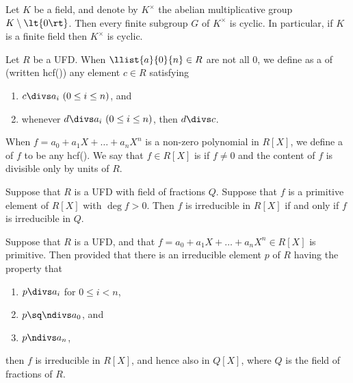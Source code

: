 \documentclass{article}
\begin{document}
  \begin{ttheorem}
    Let \( K \) be a field, and denote by \( K^\times \) the abelian multiplicative group \( K\setminus \lt\{ 0 \rt\} \).
    Then every finite subgroup \( G \) of \( K^\times \) is cyclic.
    In particular, if \( K \) is a finite field then \( K^\times \) is cyclic.
  \end{ttheorem}

  \begin{tdefinition}
    Let \( R \) be a UFD.
    When \( \llist{a}{0}{n}\in R \) are not all 0, we define as a  of  (written hcf()) any element \( c\in R \) satisfying \begin{enumerate}[label=(\roman*)]
      \item \( c\divs a_i\ (0\leq i\leq n) \), and
      \item whenever \( d\divs a_i\ (0\leq i\leq n) \), then \( d\divs c \).
    \end{enumerate}
    When \( f=a_0+a_1X+\ldots +a_nX^n \) is a non-zero polynomial in \( R[X] \), we define a  of \( f \) to be any hcf().
    We say that \( f\in R[X] \) is  if \( f\neq 0 \) and the content of \( f \) is divisible only by units of \( R \).
  \end{tdefinition}

  \begin{ttheorem}
    Suppose that \( R \) is a UFD with field of fractions \( Q \).
    Suppose that \( f \) is a primitive element of \( R[X] \) with \( \deg f > 0 \).
    Then \( f \) is irreducible in \( R[X] \) if and only if \( f \) is irreducible in \( Q \).
  \end{ttheorem}

  \begin{ttheorem}
    Suppose that \( R \) is a UFD, and that \( f=a_0+a_1X+\ldots +a_nX^n \in R[X] \) is primitive.
    Then provided that there is an irreducible element \( p \) of \( R \) having the property that \begin{enumerate}[label=(\roman*)]
      \item \( p\divs a_i \) for \( 0\leq i < n \),
      \item \( p\sq \ndivs a_0 \), and
      \item \( p\ndivs a_n \),
    \end{enumerate}
    then \( f \) is irreducible in \( R[X] \), and hence also in \( Q[X] \), where \( Q \) is the field of fractions of \( R \).
  \end{ttheorem}
\end{document}
